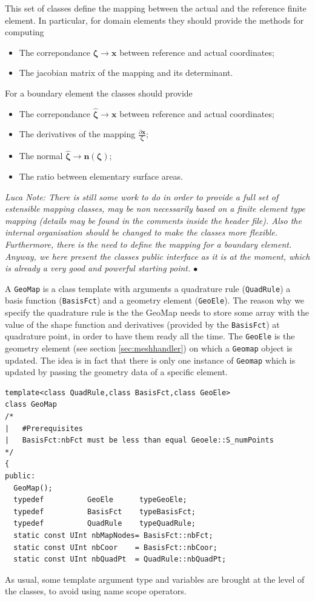 This set of classes define the mapping between the actual and the
reference finite element. In particular, for domain elements
they should provide the methods for
computing
\begin{itemize}
\item The correpondance $\boldsymbol{\zeta}\to\mathbf{x}$ between
reference and actual coordinates;
\item The jacobian matrix of the mapping and its determinant.
\end{itemize}
For a boundary element the classes should provide
\begin{itemize}
\item The correpondance $\hat{\boldsymbol{\zeta}}\to\mathbf{x}$ between
reference and actual coordinates;
\item The derivatives of the mapping $\frac{\partial{\mathbf{x}}}{\boldsymbol{\zeta}}$;
\item The normal $\hat{\boldsymbol{\zeta}}\to\mathbf{n}(\boldsymbol{\zeta})$;
\item The ratio between elementary surface areas.
\end{itemize}

\textsl{Luca Note: There is still some work to do in order to provide a
  full set of estensible mapping classes, may be non necessarily based
  on a finite element type mapping (details may be found in the comments
  inside the header file).  Also the internal organisation should be
  changed to make the classes more flexible.  Furthermore, there is the
  need to define the mapping for a boundary element.  Anyway, we here
  present the classes public interface as it is at the moment, which is
  already a very good and powerful starting point. $\bullet$}

 
A \texttt{GeoMap} is a class template with arguments a quadrature rule
(\texttt{QuadRule}) a basis function (\texttt{BasisFct}) and a geometry
element (\texttt{GeoEle}).  The reason why we specify the quadrature
rule is the the GeoMap needs to store some array with the value of the
shape function and derivatives (provided by the \texttt{BasisFct}) at
quadrature point, in order to have them ready all the time. The
\texttt{GeoEle} is the geometry element (see section
\ref{sec:meshhandler}) on which a \texttt{Geomap} object is updated.
The idea is in fact that there is only one instance of \texttt{Geomap}
which is updated by passing the geometry data of a specific element.


\begin{verbatim}
template<class QuadRule,class BasisFct,class GeoEle>
class GeoMap
/*
|   #Prerequisites
|   BasisFct:nbFct must be less than equal Geoele::S_numPoints
*/
{
public:
  GeoMap();
  typedef          GeoEle      typeGeoEle;
  typedef          BasisFct    typeBasisFct;
  typedef          QuadRule    typeQuadRule;
  static const UInt nbMapNodes= BasisFct::nbFct;
  static const UInt nbCoor    = BasisFct::nbCoor;
  static const UInt nbQuadPt  = QuadRule::nbQuadPt;
\end{verbatim}
As usual, some template argument type and variables are 
brought at the level of the classes, to avoid using
name scope operators.

